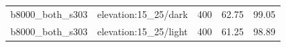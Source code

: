 \begin{longtable}{l>{\raggedright\arraybackslash}p{.42\linewidth}rrr}
b8000\_\allowbreak{}both\_\allowbreak{}s303 & %
elevation:15\_\allowbreak{}25/dark & %
400 & %
62.75 & %
99.05 \\ %

b8000\_\allowbreak{}both\_\allowbreak{}s303 & %
elevation:15\_\allowbreak{}25/light & %
400 & %
61.25 & %
98.89 \\ %


\end{longtable}
